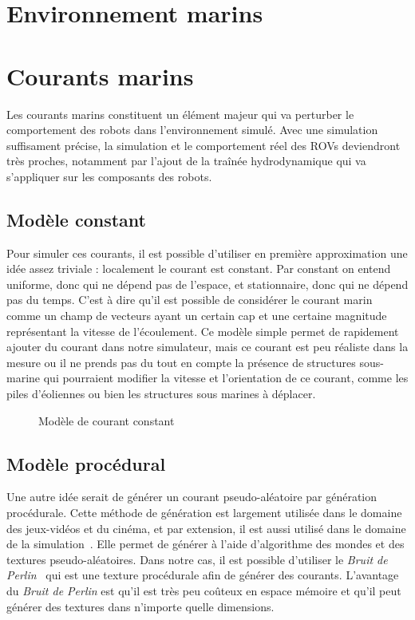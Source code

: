 	\section{Environnement marins}

		\section{Courants marins}

			Les courants marins constituent un élément majeur qui va perturber le comportement des robots dans l'environnement simulé. Avec une simulation suffisament précise, la simulation et le comportement réel des \gls{ROV}s deviendront très proches, notamment par l'ajout de la traînée hydrodynamique qui va s'appliquer sur les composants des robots.

			\subsection{Modèle constant}

				Pour simuler ces courants, il est possible d'utiliser en première approximation une idée assez triviale : localement le courant est constant. Par constant on entend uniforme, donc qui ne dépend pas de l'espace, et stationnaire, donc qui ne dépend pas du temps. C'est à dire qu'il est possible de considérer le courant marin  comme un champ de vecteurs ayant un certain cap et une certaine magnitude représentant la vitesse de l'écoulement. Ce modèle simple permet de rapidement ajouter du courant dans notre simulateur, mais ce courant est peu réaliste dans la mesure ou il ne prends pas du tout en compte la présence de structures sous-marine qui pourraient modifier la vitesse et l'orientation de ce courant, comme les piles d'éoliennes ou bien les structures sous marines à déplacer.

				\begin{figure}[!htb]
					\centering
					\caption{Modèle de courant constant}
					\label{fig:constant}
				\end{figure}

			\subsection{Modèle procédural}

				Une autre idée serait de générer un courant pseudo-aléatoire par génération procédurale. Cette méthode de génération est largement utilisée dans le domaine des jeux-vidéos et du cinéma, et par extension, il est aussi utilisé dans le domaine de la simulation~\cite{generation_procedurale_monde, volumetric_terrain_generation}. Elle permet de générer à l'aide d'algorithme des mondes et des textures pseudo-aléatoires. Dans notre cas, il est possible d'utiliser le \textit{Bruit de Perlin}~\cite{PerlinNoise} qui est une texture procédurale afin de générer des courants. L'avantage du \textit{Bruit de Perlin} est qu'il est très peu coûteux en espace mémoire et qu'il peut générer des textures dans n'importe quelle dimensions. 
				
